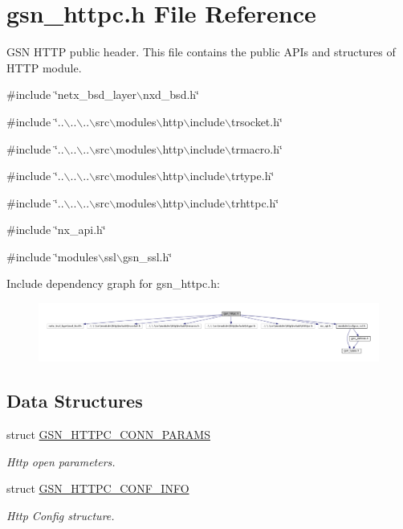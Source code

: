 \hypertarget{a00507}{
\section{gsn\_\-httpc.h File Reference}
\label{a00507}
}


GSN HTTP public header. This file contains the public APIs and structures of HTTP module.  


{\ttfamily \#include \char`\"{}netx\_\-bsd\_\-layer$\backslash$nxd\_\-bsd.h\char`\"{}}\par
{\ttfamily \#include \char`\"{}..$\backslash$..$\backslash$..$\backslash$src$\backslash$modules$\backslash$http$\backslash$include$\backslash$trsocket.h\char`\"{}}\par
{\ttfamily \#include \char`\"{}..$\backslash$..$\backslash$..$\backslash$src$\backslash$modules$\backslash$http$\backslash$include$\backslash$trmacro.h\char`\"{}}\par
{\ttfamily \#include \char`\"{}..$\backslash$..$\backslash$..$\backslash$src$\backslash$modules$\backslash$http$\backslash$include$\backslash$trtype.h\char`\"{}}\par
{\ttfamily \#include \char`\"{}..$\backslash$..$\backslash$..$\backslash$src$\backslash$modules$\backslash$http$\backslash$include$\backslash$trhttpc.h\char`\"{}}\par
{\ttfamily \#include \char`\"{}nx\_\-api.h\char`\"{}}\par
{\ttfamily \#include \char`\"{}modules$\backslash$ssl$\backslash$gsn\_\-ssl.h\char`\"{}}\par
Include dependency graph for gsn\_\-httpc.h:
\nopagebreak
\begin{figure}[H]
\begin{center}
\leavevmode
\includegraphics[width=400pt]{a00738}
\end{center}
\end{figure}
\subsection*{Data Structures}
\begin{DoxyCompactItemize}
\item 
struct \hyperlink{a00094}{GSN\_\-HTTPC\_\-CONN\_\-PARAMS}
\begin{DoxyCompactList}\small\item\em Http open parameters. \end{DoxyCompactList}\item 
struct \hyperlink{a00093}{GSN\_\-HTTPC\_\-CONF\_\-INFO}
\begin{DoxyCompactList}\small\item\em Http Config structure. \end{DoxyCompactList}\end{DoxyCompactItemize}
